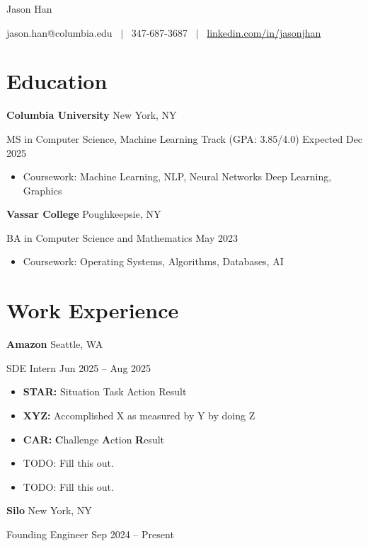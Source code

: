\documentclass[11pt]{article}
\newcommand{\resumeentry}[4]{%
\textbf{#1} \hfill {\small #2}
\par
{\small #3} \hfill {\small #4}}
\begin{document}
{\centering%
{\huge Jason Han \par}
\medskip
{jason.han@columbia.edu ~$\vert$~ {\small 347-687-3687} ~$\vert$~ \href{https://www.linkedin.com/in/jasonjhan/}{linkedin.com/in/jasonjhan} \par}}

\section{Education}
\resumeentry{Columbia University}{New York, NY}{MS in Computer Science, Machine Learning Track (GPA: 3.85/4.0)}{Expected Dec 2025}
\begin{itemize}
  \item {\small Coursework: Machine Learning, NLP, Neural Networks Deep Learning, Graphics}
\end{itemize}

\smallskip

\resumeentry{Vassar College}{Poughkeepsie, NY}{BA in Computer Science and Mathematics}{May 2023}
\begin{itemize}
  \item {\small Coursework: Operating Systems, Algorithms, Databases, AI}
\end{itemize}

\section{Work Experience}
\resumeentry{Amazon}{Seattle, WA}{SDE Intern}{Jun 2025 -- Aug 2025}
\begin{itemize}
  \item \textbf{STAR:} Situation Task Action Result
  \item \textbf{XYZ:} Accomplished X as measured by Y by doing Z
  \item \textbf{CAR:} \textbf{C}hallenge \textbf{A}ction \textbf{R}esult
  \item TODO: Fill this out.
  \item TODO: Fill this out.
\end{itemize}

\smallskip

\resumeentry{Silo}{New York, NY}{Founding Engineer}{Sep 2024 -- Present}
\end{document}
